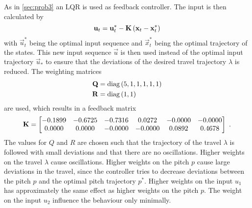 As in \cref{sec:prob3} an LQR is used as feedback controller. The input is then calculated by
\begin{equation}
\mathbf{u}_t=\mathbf{u}_t^*-\mathbf{K}\left(\mathbf{x}_t-\mathbf{x}_t^*\right)
\end{equation}
with $\vec{u}_t^*$ being the optimal input sequence and $\vec{x}_t^*$ being the optimal trajectory of the states. This new input sequence $\vec{u}$ is then used instead of the optimal input trajectory $\vec{u}_*$ to ensure that the deviations of the desired travel trajectory $\lambda$ is reduced. The weighting matrices 
\begin{subequations}
	\begin{align}
	\mathbf{Q}&=\mathrm{diag}\left(5,1,1,1,1,1\right)\\
	\mathbf{R}&=\mathrm{diag}\left(1,1\right)
	\end{align}
\end{subequations}
are used, which results in a feedback matrix
\begin{equation}
\vec{K}=\begin{bmatrix}
-0.1899  & -0.6725  & -0.7316  &  0.0272  & -0.0000  & -0.0000\\
0.0000   & 0.0000   & -0.0000  & -0.0000  & 0.0892   & 0.4678
\label{eq:problem4_lqr}%
\end{bmatrix}\FullStop
\end{equation}
The values for $Q$ and $R$ are chosen such that the trajectory of the travel $\lambda$ is followed with small deviations and that there are no oscillations. Higher weights on the travel $\lambda$ cause oscillations. Higher weights on the pitch $p$ cause large deviations in the travel, since the controller tries to decrease deviations between the pitch $p$ and the optimal pitch trajectory $p^*$. Higher weights on the input $u_1$ has approximately the same effect as higher weights on the pitch $p$. The weight on the input $u_2$ influence the behaviour only minimally.

